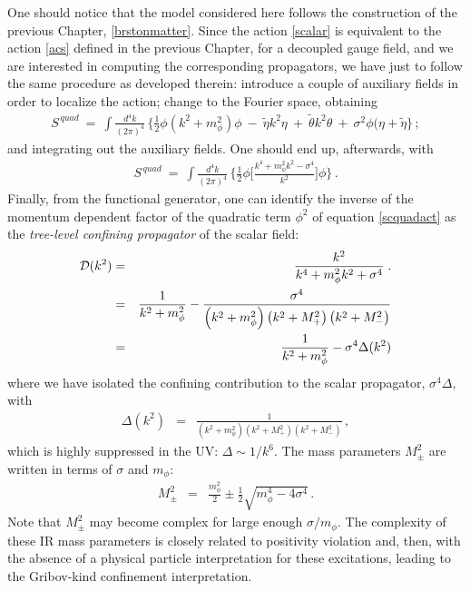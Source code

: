 One should notice that the model considered here follows the construction of the previous
Chapter, \ref{brstonmatter}. Since the action \eqref{scalar} is equivalent to the action
\eqref{acs} defined in the previous Chapter, for a decoupled gauge field, and we are
interested in computing the corresponding propagators, we have just to follow the same
procedure as developed therein: introduce a couple of auxiliary fields in
order to localize the action; change to the Fourier space, obtaining
\begin{eqnarray}
S^{\,quad} ~=~ \int \frac{d^{4}k}{(2\pi)^{4}}\, 
\Bigg\{ 
\frac 12 \phi \left( k^2 + m_{\phi}^2 \right) \phi ~ - ~
\tilde{\eta} k^{2} \eta ~+~ \tilde{\theta} k^{2} \theta ~+~
\sigma^{2}\phi(\eta + \tilde{\eta}
\Bigg\}\,;
\end{eqnarray}
and integrating out the auxiliary fields. One should end up, afterwards, with
\begin{eqnarray}
S^{\,quad} ~=~ \int \frac{d^{4}k}{(2\pi)^{4}}\, 
\Bigg\{ 
\frac 12 \phi \Biggl[ \frac{ k^{4} +m_{\phi}^{2}k^{2} - \sigma^{4}}{k^{2}} \Biggr] \phi
\Bigg\}\,.
\label{scquadact}
\end{eqnarray}
Finally, from the functional generator, one can identify the inverse of the momentum dependent
factor of the quadratic term $\phi^{2}$ of equation \eqref{scquadact} as the \emph{tree-level
confining propagator} of the scalar field:
\begin{eqnarray} 
{\cal D}(k^2) & = & \frac{k^2}{k^4 +m_{\phi}^2k^2 + \sigma^4}  \;.\nonumber\\ 
& = &  \frac{1}{k^2 +  m_{\phi}^2} - \frac{\sigma^4 }{\left(k^2 +  m_{\phi}^2\right)\left(k^2 +
M_{+}^2\right)\left(k^2 +  M_{-}^2\right)}
\nonumber\\ 
& = &  \frac{1}{k^2 +  m_{\phi}^2} -
\sigma^4 \Delta(k^2)
\label{scalarprop}
\end{eqnarray}
where we have isolated the confining contribution to the scalar propagator, $\sigma^4\Delta$,
with
\begin{eqnarray} 
\Delta(k^2)&=& \frac{1}{\left(k^2 +  m_{\phi}^2\right)\left(k^2 +  M_{+}^2\right)\left(k^2 +
M_{-}^2\right)}\label{delta}\,,
\end{eqnarray}
which is highly suppressed in the UV: $\Delta\sim 1/k^6$. The mass parameters $M^2_{\pm}$ are
written in terms of $\sigma$ and $m_{\phi}$:
\begin{eqnarray} 
M^2_{\pm}&=& \frac{m_{\phi}^2}{2} \pm \frac 12 \sqrt{m_{\phi}^4 - 4\sigma^4} \,.
\label{scalarmasses}
\end{eqnarray}
Note that $M^2_{\pm}$ may become complex for large enough $\sigma/m_{\phi}$. The complexity of
these IR mass parameters is closely related to positivity violation and, then, with the absence
of a physical particle interpretation for these excitations, leading to the Gribov-kind
confinement interpretation.

